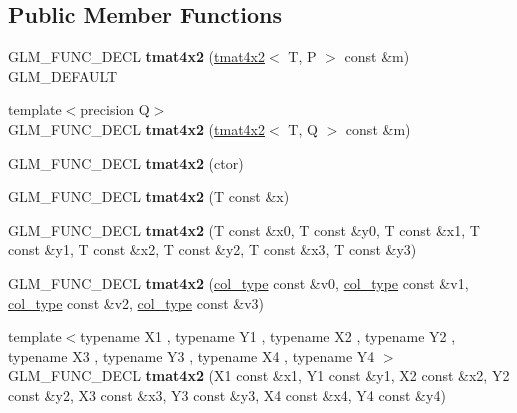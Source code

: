 \subsection*{Public Member Functions}
\begin{DoxyCompactItemize}
\item 
\hypertarget{structglm_1_1tmat4x2_a8573e7d7acf01aa378eee49f7e9c580a}{G\-L\-M\-\_\-\-F\-U\-N\-C\-\_\-\-D\-E\-C\-L {\bfseries tmat4x2} (\hyperlink{structglm_1_1tmat4x2}{tmat4x2}$<$ T, P $>$ const \&m) G\-L\-M\-\_\-\-D\-E\-F\-A\-U\-L\-T}\label{structglm_1_1tmat4x2_a8573e7d7acf01aa378eee49f7e9c580a}

\item 
\hypertarget{structglm_1_1tmat4x2_a9f5f9c3246c12a56efb4a81ccb83b844}{{\footnotesize template$<$precision Q$>$ }\\G\-L\-M\-\_\-\-F\-U\-N\-C\-\_\-\-D\-E\-C\-L {\bfseries tmat4x2} (\hyperlink{structglm_1_1tmat4x2}{tmat4x2}$<$ T, Q $>$ const \&m)}\label{structglm_1_1tmat4x2_a9f5f9c3246c12a56efb4a81ccb83b844}

\item 
\hypertarget{structglm_1_1tmat4x2_ac17f4e7853b8f8cceb17b9fa16ace0c8}{G\-L\-M\-\_\-\-F\-U\-N\-C\-\_\-\-D\-E\-C\-L {\bfseries tmat4x2} (ctor)}\label{structglm_1_1tmat4x2_ac17f4e7853b8f8cceb17b9fa16ace0c8}

\item 
\hypertarget{structglm_1_1tmat4x2_acdad48f49673e85f82c714b81f1b31a5}{G\-L\-M\-\_\-\-F\-U\-N\-C\-\_\-\-D\-E\-C\-L {\bfseries tmat4x2} (T const \&x)}\label{structglm_1_1tmat4x2_acdad48f49673e85f82c714b81f1b31a5}

\item 
\hypertarget{structglm_1_1tmat4x2_a25c42d43a9eef005d996195b575615cd}{G\-L\-M\-\_\-\-F\-U\-N\-C\-\_\-\-D\-E\-C\-L {\bfseries tmat4x2} (T const \&x0, T const \&y0, T const \&x1, T const \&y1, T const \&x2, T const \&y2, T const \&x3, T const \&y3)}\label{structglm_1_1tmat4x2_a25c42d43a9eef005d996195b575615cd}

\item 
\hypertarget{structglm_1_1tmat4x2_aa89564f4323d095565f9072ef4b01c75}{G\-L\-M\-\_\-\-F\-U\-N\-C\-\_\-\-D\-E\-C\-L {\bfseries tmat4x2} (\hyperlink{structglm_1_1tvec2}{col\-\_\-type} const \&v0, \hyperlink{structglm_1_1tvec2}{col\-\_\-type} const \&v1, \hyperlink{structglm_1_1tvec2}{col\-\_\-type} const \&v2, \hyperlink{structglm_1_1tvec2}{col\-\_\-type} const \&v3)}\label{structglm_1_1tmat4x2_aa89564f4323d095565f9072ef4b01c75}

\item 
\hypertarget{structglm_1_1tmat4x2_affe5fab2286a957920117dc8f8893a34}{{\footnotesize template$<$typename X1 , typename Y1 , typename X2 , typename Y2 , typename X3 , typename Y3 , typename X4 , typename Y4 $>$ }\\G\-L\-M\-\_\-\-F\-U\-N\-C\-\_\-\-D\-E\-C\-L {\bfseries tmat4x2} (X1 const \&x1, Y1 const \&y1, X2 const \&x2, Y2 const \&y2, X3 const \&x3, Y3 const \&y3, X4 const \&x4, Y4 const \&y4)}\label{structglm_1_1tmat4x2_affe5fab2286a957920117dc8f8893a34}


\end{DoxyCompactItemize}
